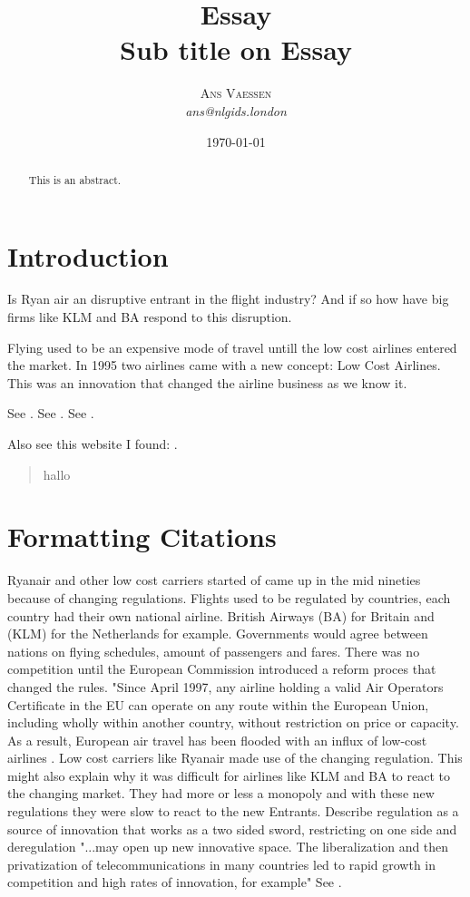 \documentclass[a4paper, 11pt]{article}
\title{\textbf{Essay}\\Sub title on Essay}
\author{\textsc{Ans Vaessen}
\\{\textit{ans@nlgids.london}}}
\date{\today}
\begin{document}
\maketitle

\begin{abstract}
This is an abstract.
\end{abstract}

\vspace{30pt} %

\section*{Introduction}
Is Ryan air an disruptive entrant in the flight industry? And if so how have big firms like KLM and BA respond to this disruption.


Flying used to be an expensive mode of travel untill the low cost airlines entered the market. In 1995 two airlines came with a new concept: Low Cost Airlines. This was an innovation that changed the airline business as we know it.




See \cite{Christensen97}.
See \citep{Christensen97}.
See \citep[p. 145]{Christensen97}.

Also see this website I found: \cite{TripAdvisor}.

\begin{quote}
hallo
\end{quote}

\section{Formatting Citations}

Ryanair and other low cost carriers started of came up in the mid nineties because of changing regulations.
Flights used to be regulated by countries, each country had their own national airline. British Airways (BA) for Britain and (KLM) for the Netherlands for example. Governments would agree between nations on flying schedules, amount of passengers and fares. There was no competition until the European Commission introduced a reform proces that changed the rules. "Since April 1997, any airline holding a valid Air Operators Certificate in the EU can operate on any route within the European Union, including wholly within another country, without restriction on price or capacity. As a result, European air travel has been flooded with an influx of low-cost airlines \citep{Eurocontrol}. Low cost carriers like Ryanair made use of the changing regulation. This might also explain why it was difficult for airlines like KLM and BA to react to the changing market. They had more or less a monopoly and with these new regulations they were slow to react to the new Entrants. \citep{TiddBessant} Describe regulation as a source of innovation that works as a two sided sword, restricting on one side and deregulation "...may open up new innovative space. The liberalization and then privatization of telecommunications in many countries led to rapid growth in competition and high rates of innovation, for example" See \citep[p. 219]{TiddBessant}.
\end{document}

